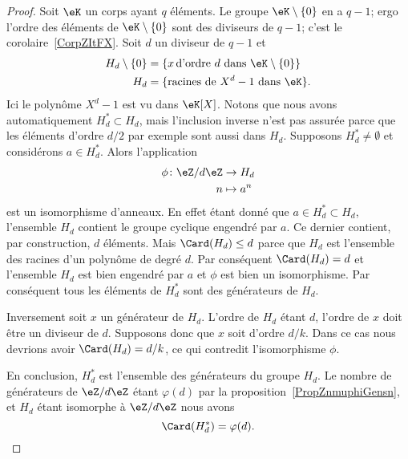 \begin{proof}
	Soit \( \eK\) un corps ayant \( q\) éléments. Le groupe \( \eK\setminus\{ 0 \}\) en a \( q-1\); ergo l'ordre des éléments de \( \eK\setminus\{ 0 \}\) sont des diviseurs de \( q-1\); c'est le corolaire~\ref{CorpZItFX}. Soit \( d\) un diviseur de \( q-1\) et
	\begin{subequations}
		\begin{align}
			H_d\setminus\{ 0 \} & =\{ x\,\text{d'ordre }      d  \text{ dans } \eK\setminus\{ 0 \} \} \\
			H_d                 & =\{    \text{racines de } X^d-1\text{ dans } \eK \}.
		\end{align}
	\end{subequations}
	Ici le polynôme \( X^d-1\) est vu dans \( \eK[X]\). Notons que nous avons automatiquement \( H^*_d\subset H_d\), mais l'inclusion inverse n'est pas assurée parce que les éléments d'ordre \( d/2\) par exemple sont aussi dans \( H_d\). Supposons \( H^*_d\neq \emptyset\) et considérons \( a\in H^*_d\). Alors l'application
	\begin{equation}
		\begin{aligned}
			\phi\colon \eZ/d\eZ & \to H_d     \\
			n                   & \mapsto a^n
		\end{aligned}
	\end{equation}
	est un isomorphisme d'anneaux. En effet étant donné que \( a\in H^*_d\subset H_d\), l'ensemble \( H_d\) contient le groupe cyclique engendré par \( a\). Ce dernier contient, par construction, \( d\) éléments. Mais \( \Card(H_d)\leq d\) parce que \( H_d\) est l'ensemble des racines d'un polynôme de degré \( d\). Par conséquent \( \Card(H_d)=d\) et l'ensemble \( H_d\) est bien engendré par \( a\) et \( \phi\) est bien un isomorphisme. Par conséquent tous les éléments de \( H^*_d\) sont des générateurs de \( H_d\).

	Inversement soit \( x\) un générateur de \( H_d\). L'ordre de \( H_d\) étant \( d\), l'ordre de \( x\) doit être un diviseur de \( d\). Supposons donc que \( x\) soit d'ordre \( d/k\). Dans ce cas nous devrions avoir \( \Card(H_d)=d/k\), ce qui contredit l'isomorphisme \( \phi\).

	En conclusion, \( H^*_d\) est l'ensemble des générateurs du groupe \( H_d\). Le nombre de générateurs de \( \eZ/d\eZ\) étant \( \varphi(d)\) par la proposition~\ref{PropZnmuphiGensn}, et \( H_d\) étant isomorphe à \( \eZ/d\eZ\) nous avons
	\begin{equation}
		\Card(H^*_d)=\varphi(d).
	\end{equation}


\end{proof}
